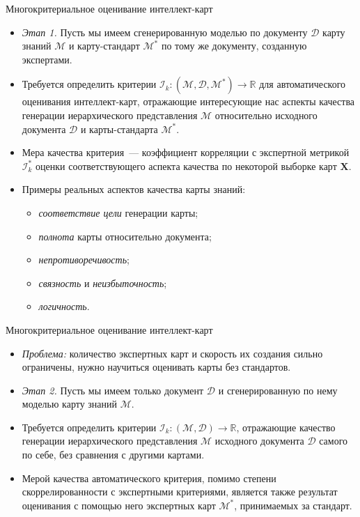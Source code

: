 \documentclass{beamer}
\newcommand{\D}{\mathcal{D}}
\newcommand{\X}{\mathbf{X}}
\newcommand{\I}{\mathcal{I}}
\newcommand{\M}{\mathcal{M}}
\newcommand{\R}{\mathbb{R}}
\begin{document}

\begin{frame}{Многокритериальное оценивание интеллект-карт}

\begin{itemize}
    \item \emph{Этап 1.} Пусть мы имеем сгенерированную моделью по документу $\D$ карту знаний $\M$ и карту-стандарт $\M^*$ по тому же документу, созданную экспертами. 
    \item Требуется определить критерии $\I_k: (\M, \D, \M^*) \rightarrow \R$ для автоматического оценивания интеллект-карт, отражающие интересующие нас аспекты качества генерации иерархического представления $\M$ относительно исходного документа $\D$ и карты-стандарта $\M^*$. 
    \item Мера качества критерия~--- коэффициент корреляции с экспертной метрикой $\I^*_k$ оценки соответствующего аспекта качества по некоторой выборке карт $\X$.
    \item Примеры реальных аспектов качества карты знаний:
    \begin{itemize}
        \item \textit{соответствие цели} генерации карты;
        \item \textit{полнота} карты относительно документа;
        \item \textit{непротиворечивость};
        \item \textit{связность} и \textit{неизбыточность};
        \item \textit{логичность}.
    \end{itemize}
\end{itemize}

\end{frame}


\begin{frame}{Многокритериальное оценивание интеллект-карт}

\begin{itemize}
    \item \emph{Проблема:} количество экспертных карт и скорость их создания сильно ограничены, нужно научиться оценивать карты без стандартов. 
    \item \emph{Этап 2.} Пусть мы имеем только документ $\D$ и сгенерированную по нему моделью карту знаний $\M$.
    \item Требуется определить критерии $\I_k: (\M, \D) \rightarrow \R$, отражающие качество генерации иерархического представления $\M$ исходного документа $\D$ самого по себе, без сравнения с другими картами. 
    \item Мерой качества автоматического критерия, помимо степени скоррелированности с экспертными критериями, является также результат оценивания с помощью него экспертных карт $\M^*$, принимаемых за стандарт.
\end{itemize}

\end{frame}
\end{document}
